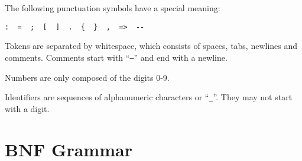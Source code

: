 The following punctuation symbols have a special meaning:
\begin{verbatim}
:  =  ;  [  ]  .  {  }  ,  =>  --
\end{verbatim}

Tokens are separated by whitespace, which consists of spaces, tabs,
newlines and comments. Comments start with ``{\tt --}'' and end
with a newline.

Numbers are only composed of the digits 0-9.

Identifiers are sequences of alphanumeric characters or ``{\tt \_}''.
They may not start with a digit.


\chapter{BNF Grammar}


